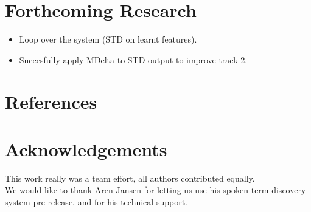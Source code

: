 \documentclass[final]{beamer}
\begin{document}
\begin{frame}[t]
\begin{multicols}{3}


\section{Forthcoming Research}

\begin{itemize}
\item Loop over the system (STD on learnt features).
\item Succesfully apply MDelta to STD output to improve track 2.
\end{itemize}


\section{References}

\nocite{*} %


\section{Acknowledgements}

This work really was a team effort, all authors contributed equally.\\
We would like to thank Aren Jansen for letting us use his spoken term discovery system pre-release, and for his technical support.


\end{multicols}

\end{frame}
\end{document}
